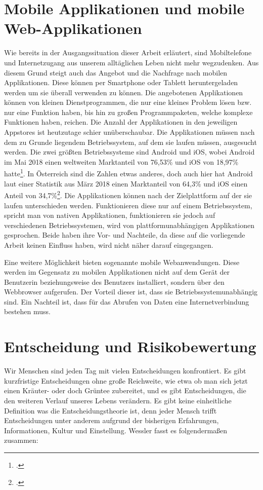 \section{Mobile Applikationen und mobile Web-Applikationen}

Wie bereits in der Ausgangssituation dieser Arbeit erläutert, sind Mobiltelefone und Internetzugang aus unserem alltäglichen Leben nicht mehr wegzudenken. Aus diesem Grund steigt auch das Angebot und die Nachfrage nach mobilen Applikationen. Diese können per Smartphone oder Tablett heruntergeladen werden um sie überall verwenden zu können. Die angebotenen Applikationen können von kleinen Dienstprogrammen, die nur eine kleines Problem lösen bzw. nur eine Funktion haben, bis hin zu großen Programmpaketen, welche komplexe Funktionen haben, reichen. Die Anzahl der Applikationen in den jeweiligen Appstores ist heutzutage schier unüberschaubar. Die Applikationen müssen nach dem zu Grunde liegendem Betriebssystem, auf dem sie laufen müssen, ausgesucht werden. Die zwei größten Betriebssysteme sind Android und iOS, wobei Android im Mai 2018 einen weltweiten Marktanteil von 76,53\% und iOS von 18,97\% hatte\footcite{mobileos}. In Österreich sind die Zahlen etwas anderes, doch auch hier hat Android laut einer Statistik aus März 2018 einen Marktanteil von 64,3\% und iOS einen Anteil von 34,7\%\footcite{stat}.
Die Applikationen können nach der Zielplattform auf der sie laufen unterschieden werden. Funktionieren diese nur auf einem Betriebssystem, spricht man von nativen Applikationen, funktionieren sie jedoch auf verschiedenen Betriebssystemen, wird von plattformunabhängigen Applikationen gesprochen. Beide haben ihre Vor- und Nachteile, da diese auf die vorliegende Arbeit keinen Einfluss haben, wird nicht näher darauf eingegangen.

Eine weitere Möglichkeit bieten sogenannte mobile Webanwendungen. Diese werden im Gegensatz zu mobilen Applikationen nicht auf dem Gerät der Benutzerin beziehungsweise des Benutzers installiert, sondern über den Webbrowser aufgerufen. Der Vorteil dieser ist, dass sie Betriebssystemunabhängig sind. Ein Nachteil ist, dass für das Abrufen von Daten eine Internetverbindung bestehen muss.

\section{Entscheidung und Risikobewertung}

Wir Menschen sind jeden Tag mit vielen Entscheidungen konfrontiert. Es gibt kurzfristige Entscheidungen ohne große Reichweite, wie etwa ob man sich jetzt einen Kräuter- oder doch Grüntee zubereitet, und es gibt Entscheidungen, die den weiteren Verlauf unseres Lebens verändern. Es gibt keine einheitliche Definition was die Entscheidungstheorie ist, denn jeder Mensch trifft Entscheidungen unter anderem aufgrund der bisherigen Erfahrungen, Informationen, Kultur und Einstellung. Wessler fasst es folgendermaßen zusammen:

